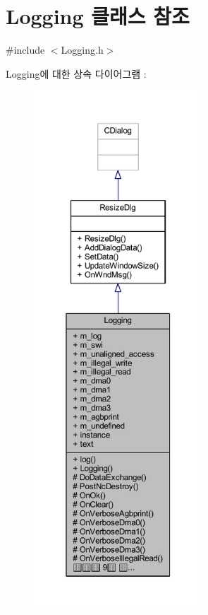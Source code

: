 \hypertarget{class_logging}{}\section{Logging 클래스 참조}
\label{class_logging}


{\ttfamily \#include $<$Logging.\+h$>$}



Logging에 대한 상속 다이어그램 \+: \nopagebreak
\begin{figure}[H]
\begin{center}
\leavevmode
\includegraphics[height=550pt]{class_logging__inherit__graph}
\end{center}
\end{figure}


